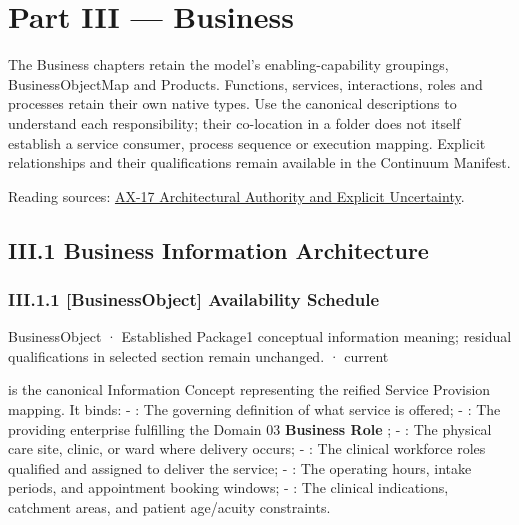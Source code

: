 \part*{Part III — Business}
\label{navigation:III}
The Business chapters retain the model's enabling-capability groupings, BusinessObjectMap and Products. Functions, services, interactions, roles and processes retain their own native types. Use the canonical descriptions to understand each responsibility; their co-location in a folder does not itself establish a service consumer, process sequence or execution mapping. Explicit relationships and their qualifications remain available in the Continuum Manifest.

{\small Reading sources: \hyperref[element:8882573df7ce43c6bc0f66da0a676139]{AX-17 Architectural Authority and Explicit Uncertainty}.}\par
\chapter*{III.1 Business Information Architecture}
\label{navigation:III.1}

\section*{III.1.1 [BusinessObject] Availability Schedule}
\label{navigation:III.1.1}

\label{element:96638431fc39486d879d080768a68fe9}
{\small BusinessObject · Established Package1 conceptual information meaning; residual qualifications in selected section remain unchanged. · current}\par

\texttt{} is the canonical Information Concept representing the reified Service Provision mapping. It binds:
- \textbf{\texttt{}}: The governing definition of what service is offered;
- \textbf{\texttt{}}: The providing enterprise fulfilling the Domain 03 \textbf{Business Role} \texttt{};
- \textbf{\texttt{}}: The physical care site, clinic, or ward where delivery occurs;
- \textbf{\texttt{}}: The clinical workforce roles qualified and assigned to deliver the service;
- \textbf{\texttt{}}: The operating hours, intake periods, and appointment booking windows;
- \textbf{\texttt{}}: The clinical indications, catchment areas, and patient age/acuity constraints.



